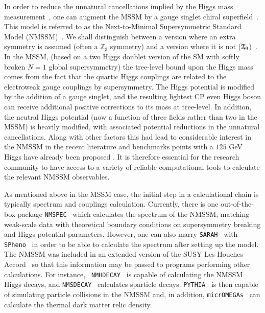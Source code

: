 \documentclass[final,3p,times,pdflatex]{elsarticle}
\def\code#1{\small{\tt #1}\normalsize}
\newcommand{\Zv}{\,\mathbf{\backslash}\mkern-11.0mu{\mathbb{Z}}_{3}} %
\begin{document}
In order to reduce the unnatural cancellations implied by the Higgs mass
measurement~\cite{Delgado:2010uj,Ellwanger:2011mu,King:2012tr,Perelstein:2012qg,Gherghetta:2012gb}, 
one can augment the MSSM by a gauge singlet chiral
superfield~\cite{BasteroGil:2000bw,Ellwanger:2009dp,Maniatis:2009re}. This model is referred to as the 
Next-to-Minimal 
Supersymmetric Standard Model (NMSSM)~\cite{NMSSM}. We shall distinguish
between a 
version where an extra symmetry is assumed (often a $\mathbb{Z}_3$ symmetry) 
and a version where it is not
($\Zv$)~\cite{Delgado:2010uj,Ell08,Ross:2011xv,Ross:2012nr}. 
In the MSSM, (based on a two Higgs doublet version of the SM with
softly broken $N=1$ global supersymmetry)
the tree-level bound upon the Higgs mass comes from the fact that 
the quartic Higgs couplings are related to the electroweak gauge couplings by
supersymmetry. The Higgs potential is modified by the addition of a gauge
singlet, and the resulting lightest CP even Higgs boson can receive additional
positive corrections to its mass at tree-level. In addition, the neutral Higgs
potential (now a function of three fields rather than two in the MSSM) is
heavily modified, with associated potential reductions in the unnatural
cancellations. Along with other factors this had lead to considerable interest in the NMSSM
in the recent literature and benchmarks points with a $125$ GeV Higgs have already been proposed \cite{King:2012is}.
It is therefore essential for the research community
to have access to a variety of reliable computational tools to calculate the relevant NMSSM observables. 

As mentioned above in the MSSM case, the initial step in a calculational
chain is 
typically spectrum and couplings calculation. Currently, there is one
out-of-the-box package {\tt NMSPEC}~\cite{Ellwanger:2006rn} which calculates
the spectrum of the 
NMSSM, matching weak-scale data with theoretical boundary conditions on
supersymmetry breaking and Higgs potential parameters. However, one can also 
marry {\tt SARAH}~\cite{Staub:2009bi,Staub:2010jh,Staub:2012pb,Staub:2013tta} with {\tt
  SPheno}~\cite{Porod:2003um} in order to be 
able to 
calculate the spectrum after setting up the model. The NMSSM was included in
an extended version of the SUSY Les Houches Accord~\cite{Allanach:2008qq} so
that this 
information may be passed to programs performing other calculations. For
instance, 
{\tt
  NMHDECAY}~\cite{Ellwanger:2005dv} is 
capable of calculating the NMSSM Higgs decays, and
{\tt NMSDECAY}~\cite{Muhlleitner:2003vg,Das:2011dg} calculates sparticle
decays. \code{PYTHIA}~\cite{Sjostrand:2007gs} is then capable of simulating
particle collisions in the NMSSM and, in addition, \code{micrOMEGAs}~\cite{Belanger:2008sj}
can calculate the thermal dark matter relic density.
\end{document}
